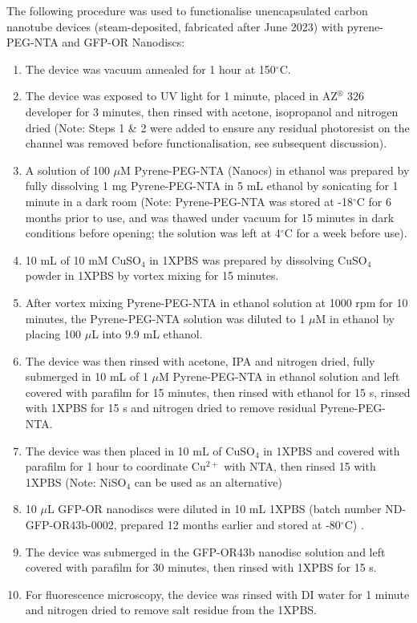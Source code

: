 \documentclass[
  a4paper,
]{scrbook}
\begin{document}
The following procedure was used to functionalise unencapsulated carbon
nanotube devices (steam-deposited, fabricated after June 2023) with
pyrene-PEG-NTA and GFP-OR Nanodiscs:

\begin{enumerate}
\def\labelenumi{\arabic{enumi}.}
\item
  The device was vacuum annealed for 1 hour at 150\(^\circ\)C.
\item
  The device was exposed to UV light for 1 minute, placed in
  AZ\(^\circledR\) 326 developer for 3 minutes, then rinsed with
  acetone, isopropanol and nitrogen dried (Note: Steps 1 \& 2 were added
  to ensure any residual photoresist on the channel was removed before
  functionalisation, see subsequent discussion).
\item
  A solution of 100 \(\mu\)M Pyrene-PEG-NTA (Nanocs) in ethanol was
  prepared by fully dissolving 1 mg Pyrene-PEG-NTA in 5 mL ethanol by
  sonicating for 1 minute in a dark room (Note: Pyrene-PEG-NTA was
  stored at -18\(^\circ\)C for 6 months prior to use, and was thawed
  under vacuum for 15 minutes in dark conditions before opening; the
  solution was left at 4\(^\circ\)C for a week before use).
\item
  10 mL of 10 mM CuSO\(_4\) in 1XPBS was prepared by dissolving
  CuSO\(_4\) powder in 1XPBS by vortex mixing for 15 minutes.
\item
  After vortex mixing Pyrene-PEG-NTA in ethanol solution at 1000 rpm for
  10 minutes, the Pyrene-PEG-NTA solution was diluted to 1 \(\mu\)M in
  ethanol by placing 100 \(\mu\)L into 9.9 mL ethanol.
\item
  The device was then rinsed with acetone, IPA and nitrogen dried, fully
  submerged in 10 mL of 1 \(\mu\)M Pyrene-PEG-NTA in ethanol solution
  and left covered with parafilm for 15 minutes, then rinsed with
  ethanol for 15 s, rinsed with 1XPBS for 15 s and nitrogen dried to
  remove residual Pyrene-PEG-NTA.
\item
  The device was then placed in 10 mL of CuSO\(_4\) in 1XPBS and covered
  with parafilm for 1 hour to coordinate Cu\(^{2+}\) with NTA, then
  rinsed 15 with 1XPBS (Note: NiSO\(_4\) can be used as an alternative)
\item
  10 \(\mu\)L GFP-OR nanodiscs were diluted in 10 mL 1XPBS (batch number
  ND-GFP-OR43b-0002, prepared 12 months earlier and stored at
  -80\(^\circ\)C) .
\item
  The device was submerged in the GFP-OR43b nanodisc solution and left
  covered with parafilm for 30 minutes, then rinsed with 1XPBS for 15 s.
\item
  For fluorescence microscopy, the device was rinsed with DI water for 1
  minute and nitrogen dried to remove salt residue from the 1XPBS.
\end{enumerate}
\end{document}
